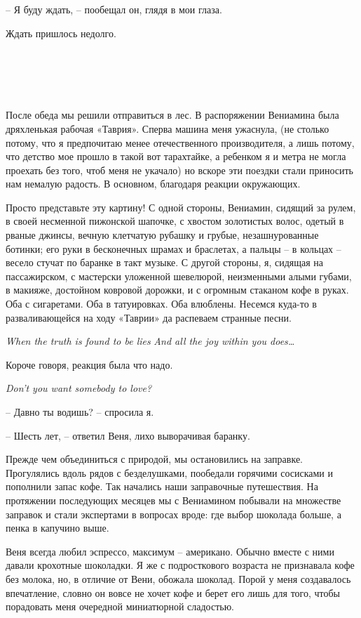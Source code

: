 \documentclass[
]{book}
\begin{document}
-- Я буду ждать, -- пообещал он, глядя в мои глаза.

Ждать пришлось недолго.

\hypertarget{chapter-12}{%
\chapter{~}\label{chapter-12}}

После обеда мы решили отправиться в лес. В распоряжении Вениамина была дряхленькая рабочая «Таврия». Сперва машина меня ужаснула, (не столько потому, что я предпочитаю менее отечественного производителя, а лишь потому, что детство мое прошло в такой вот тарахтайке, а ребенком я и метра не могла проехать без того, чтоб меня не укачало) но вскоре эти поездки стали приносить нам немалую радость. В основном, благодаря реакции окружающих.

Просто представьте эту картину! С одной стороны, Вениамин, сидящий за рулем, в своей несменной пижонской шапочке, с хвостом золотистых волос, одетый в рваные джинсы, вечную клетчатую рубашку и грубые, незашнурованные ботинки; его руки в бесконечных шрамах и браслетах, а пальцы -- в кольцах -- весело стучат по баранке в такт музыке. С другой стороны, я, сидящая на пассажирском, с мастерски уложенной шевелюрой, неизменными алыми губами, в макияже, достойном ковровой дорожки, и с огромным стаканом кофе в руках. Оба с сигаретами. Оба в татуировках. Оба влюблены. Несемся куда-то в разваливающейся на ходу «Таврии» да распеваем странные песни.

\emph{When the truth is found to be lies}
\emph{And all the joy within you does\ldots{}}

Короче говоря, реакция была что надо.

\emph{Don't you want somebody to love?}

-- Давно ты водишь? -- спросила я.

-- Шесть лет, -- ответил Веня, лихо выворачивая баранку.

Прежде чем объединиться с природой, мы остановились на заправке. Прогулялись вдоль рядов с безделушками, пообедали горячими сосисками и пополнили запас кофе. Так начались наши заправочные путешествия. На протяжении последующих месяцев мы с Вениамином побывали на множестве заправок и стали экспертами в вопросах вроде: где выбор шоколада больше, а пенка в капучино выше.

Веня всегда любил эспрессо, максимум -- американо. Обычно вместе с ними давали крохотные шоколадки. Я же с подросткового возраста не признавала кофе без молока, но, в отличие от Вени, обожала шоколад. Порой у меня создавалось впечатление, словно он вовсе не хочет кофе и берет его лишь для того, чтобы порадовать меня очередной миниатюрной сладостью.
\end{document}
